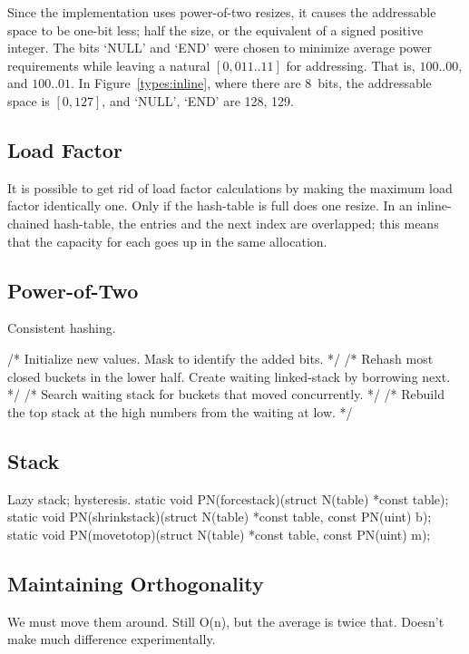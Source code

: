 \documentclass[12pt]{article}
\begin{document}
Since the implementation uses power-of-two resizes, it causes the addressable space to be one-bit less; half the size, or the equivalent of a signed positive integer. The bits `NULL' and `END' were chosen to minimize average power requirements while leaving a natural $[0, 011..11]$ for addressing. That is, $100..00$, and $100..01$. In Figure~\ref{types:inline}, where there are 8~bits, the addressable space is $[0, 127]$, and `NULL', `END' are 128, 129.

\subsection{Load Factor}

It is possible to get rid of load factor calculations by making the maximum load factor identically one. Only if the hash-table is full does one resize. In an inline-chained hash-table, the entries and the next index are overlapped; this means that the capacity for each goes up in the same allocation.

\subsection{Power-of-Two}

Consistent hashing.\cite{karger1997consistent}

/* Initialize new values. Mask to identify the added bits. */
	/* Rehash most closed buckets in the lower half. Create waiting
	 linked-stack by borrowing next. */
	/* Search waiting stack for buckets that moved concurrently. */
	/* Rebuild the top stack at the high numbers from the waiting at low. */

\subsection{Stack}

Lazy stack; hysteresis.
static void PN(forcestack)(struct N(table) *const table);
static void PN(shrinkstack)(struct N(table) *const table,
	const PN(uint) b);
static void PN(movetotop)(struct N(table) *const table, const PN(uint) m);

\subsection{Maintaining Orthogonality}

We must move them around. Still O(n), but the average is twice that. Doesn't make much difference experimentally.
\end{document}
